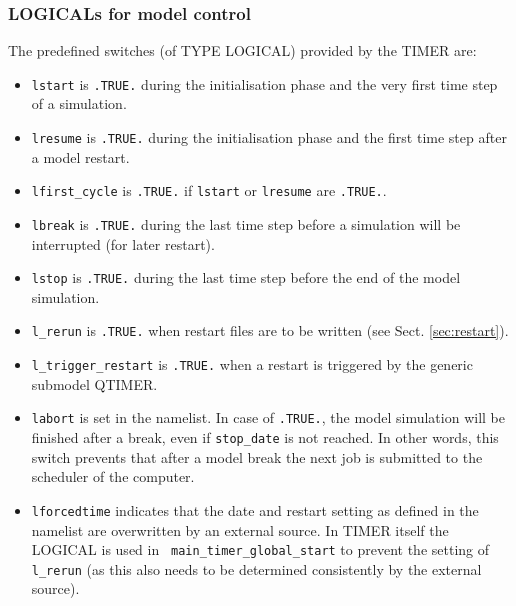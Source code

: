 \documentclass[twoside]{article}
\begin{document}
\subsubsection{{\footnotesize LOGICAL}s for model control}
\label{sec:logicals}
%
The predefined switches (of {\footnotesize TYPE} {\footnotesize LOGICAL}) provided by the TIMER
 are:
%
\begin{itemize}
\item \verb|lstart| is \verb|.TRUE.| during the initialisation phase and the
      very first time step of a simulation.
\item \verb|lresume| is \verb|.TRUE.| during the initialisation phase and the
      first time step after a model restart.  
\item \verb|lfirst_cycle| is \verb|.TRUE.| if \verb|lstart| or \verb|lresume|
      are \verb|.TRUE.|.
\item \verb|lbreak| is \verb|.TRUE.| during the last time step before a
      simulation will be interrupted (for later restart).
\item \verb|lstop| is \verb|.TRUE.| during the last time step before the end
      of the model simulation.
\item \verb|l_rerun| is \verb|.TRUE.| when restart files are to be written
  (see Sect. \ref{sec:restart}).
\item \verb|l_trigger_restart| is \verb|.TRUE.| when a restart is triggered
      by the generic submodel QTIMER.
\item \verb|labort| is set in the namelist. In case of \verb|.TRUE.|, the model 
      simulation will be finished after a break, even if \verb|stop_date| is 
      not reached. In other words, this switch prevents that after a model
      break the next job is submitted to the scheduler of the computer.
\item \verb|lforcedtime| indicates that the date and restart setting as defined
      in the namelist are overwritten by an external source. In TIMER itself
      the {\footnotesize LOGICAL} is used in \verb| main_timer_global_start| to
      prevent the setting of \verb|l_rerun| (as this also needs to be determined
      consistently by the external source).
\end{itemize}

\end{document}
